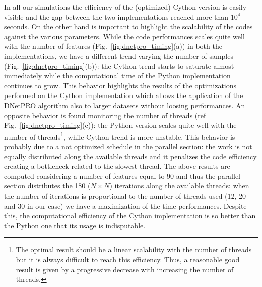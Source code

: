 \documentclass{standalone}
\begin{document}
In all our simulations the efficiency of the (optimized) Cython version is easily visible and the gap between the two implementations reached more than $10^4$ seconds.
On the other hand is important to highlight the scalability of the codes against the various parameters.
While the code performances scales quite well with the number of features (Fig.~\ref{fig:dnetpro_timing}(a)) in both the implementations, we have a different trend varying the number of samples (Fig.~\ref{fig:dnetpro_timing}(b)): the Cython trend starts to saturate almost immediately while the computational time of the Python implementation continues to grow.
This behavior highlights the results of the optimizations performed on the Cython implementation which allows the application of the DNetPRO algorithm also to larger datasets without loosing performances.
An opposite behavior is found monitoring the number of threads (ref Fig.~\ref{fig:dnetpro_timing}(c)): the Python version scales quite well with the number of threads\footnote{
  The optimal result should be a linear scalability with the number of threads but it is always difficult to reach this efficiency.
  Thus, a reasonable good result is given by a progressive decrease with increasing the number of threads.
}, while Cython trend is more unstable.
This behavior is probably due to a not optimized schedule in the parallel section: the work is not equally distributed along the available threads and it penalizes the code efficiency creating a bottleneck related to the slowest thread.
The above results are computed considering a number of features equal to 90 and thus the parallel section distributes the 180 ($N\times N$) iterations along the available threads: when the number of iterations is proportional to the number of threads used (12, 20 and 30 in our case) we have a maximization of the time performances.
Despite this, the computational efficiency of the Cython implementation is so better than the Python one that its usage is indisputable.
\end{document}
